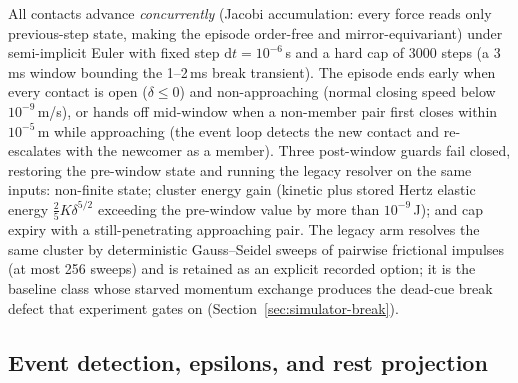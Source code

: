 All contacts advance \emph{concurrently} (Jacobi accumulation: every
force reads only previous-step state, making the episode order-free
and mirror-equivariant) under semi-implicit Euler with fixed step
$\mathrm{d}t = 10^{-6}$\,s and a hard cap of $3000$ steps (a 3\,ms
window bounding the 1--2\,ms break transient). The episode ends early
when every contact is open ($\delta \le 0$) and non-approaching
(normal closing speed below $10^{-9}$\,m/s), or hands off mid-window
when a non-member pair first closes within $10^{-5}$\,m while
approaching (the event loop detects the new contact and re-escalates
with the newcomer as a member). Three post-window guards fail closed,
restoring the pre-window state and running the legacy resolver on the
same inputs: non-finite state; cluster energy gain (kinetic plus
stored Hertz elastic energy $\tfrac{2}{5}K\delta^{5/2}$ exceeding the
pre-window value by more than $10^{-9}$\,J); and cap expiry with a
still-penetrating approaching pair. The 
legacy arm resolves the same cluster by deterministic Gauss--Seidel
sweeps of pairwise frictional impulses (at most 256 sweeps) and is
retained as an explicit recorded option; it is the baseline class
whose starved momentum exchange produces the dead-cue break defect
that experiment  gates on
(Section~\ref{sec:simulator-break}).

\subsection{Event detection, epsilons, and rest projection}
\label{sec:appendix-eq-events}

